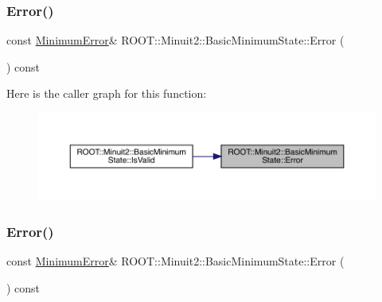 \mbox{\label{classROOT_1_1Minuit2_1_1BasicMinimumState_a67a7536f33473e23c3461e0c7029e5c5}} 
\subsubsection{\texorpdfstring{Error()}{Error()}\hspace{0.1cm}{\footnotesize\ttfamily [1/3]}}
{\footnotesize\ttfamily const \mbox{\hyperlink{classROOT_1_1Minuit2_1_1MinimumError}{Minimum\+Error}}\& R\+O\+O\+T\+::\+Minuit2\+::\+Basic\+Minimum\+State\+::\+Error (\begin{DoxyParamCaption}{ }\end{DoxyParamCaption}) const\hspace{0.3cm}{\ttfamily [inline]}}

Here is the caller graph for this function\+:
\nopagebreak
\begin{figure}[H]
\begin{center}
\leavevmode
\includegraphics[width=350pt]{d0/db1/classROOT_1_1Minuit2_1_1BasicMinimumState_a67a7536f33473e23c3461e0c7029e5c5_icgraph}
\end{center}
\end{figure}
\mbox{\label{classROOT_1_1Minuit2_1_1BasicMinimumState_a67a7536f33473e23c3461e0c7029e5c5}} 
\subsubsection{\texorpdfstring{Error()}{Error()}\hspace{0.1cm}{\footnotesize\ttfamily [2/3]}}
{\footnotesize\ttfamily const \mbox{\hyperlink{classROOT_1_1Minuit2_1_1MinimumError}{Minimum\+Error}}\& R\+O\+O\+T\+::\+Minuit2\+::\+Basic\+Minimum\+State\+::\+Error (\begin{DoxyParamCaption}{ }\end{DoxyParamCaption}) const\hspace{0.3cm}{\ttfamily [inline]}}

